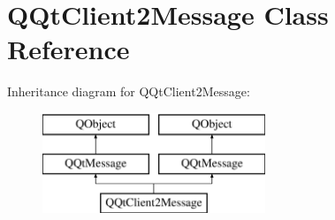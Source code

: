 \hypertarget{class_q_qt_client2_message}{}\section{Q\+Qt\+Client2\+Message Class Reference}
\label{class_q_qt_client2_message}
Inheritance diagram for Q\+Qt\+Client2\+Message\+:\begin{figure}[H]
\begin{center}
\leavevmode
\includegraphics[height=3.000000cm]{class_q_qt_client2_message}
\end{center}
\end{figure}
